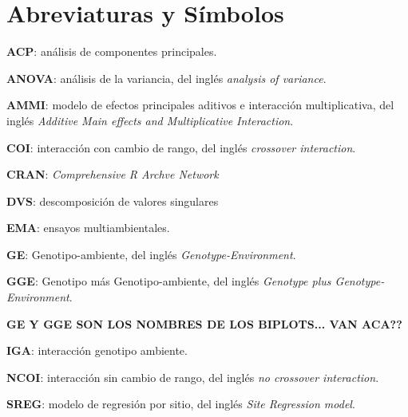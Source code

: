 

\chapter*{Abreviaturas y Símbolos}
\begin{description}
\item{\textbf{ACP}}: análisis de componentes principales.

\item{\textbf{ANOVA}}: análisis de la variancia, del inglés \emph{analysis of variance}.

\item{\textbf{AMMI}}: modelo de efectos principales aditivos e interacción multiplicativa, del inglés \emph{Additive Main effects and Multiplicative Interaction}.

\item{\textbf{COI}}: interacción con cambio de rango, del inglés \emph{crossover interaction}.

\item{\textbf{CRAN}}: \emph{Comprehensive R Archve Network}

\item{\textbf{DVS}}: descomposición de valores singulares

\item{\textbf{EMA}}: ensayos multiambientales.

\item{\textbf{GE}}: Genotipo-ambiente, del inglés \emph{Genotype-Environment}.

\item{\textbf{GGE}}: Genotipo más Genotipo-ambiente, del inglés \emph{Genotype plus Genotype-Environment}.

{\LARGE{\textbf{GE Y GGE SON LOS NOMBRES DE LOS BIPLOTS... VAN ACA??}}}

\item{\textbf{IGA}}: interacción genotipo ambiente.

\item{\textbf{NCOI}}: interacción sin cambio de rango, del inglés \emph{no crossover interaction}.

\item{\textbf{SREG}}: modelo de regresión por sitio, del inglés \emph{Site Regression model}.


\end{description}
